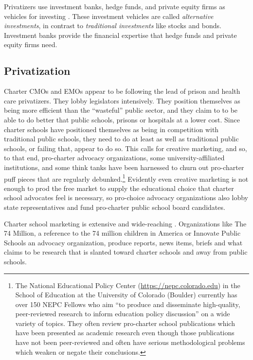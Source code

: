 Privatizers use investment banks, hedge funds, and private equity firms as vehicles for investing \parencite{Stowell2018}. These investment vehicles are called \textit{alternative investments}, in contrast to \textit{traditional investments} like stocks and bonds. Investment banks provide the financial expertise that hedge funds and private equity firms need. 

\subsection{Privatization}\label{sec:privatization}\indent

Charter CMOs and EMOs appear to be following the lead of prison and health care privatizers. They lobby legislators intensively. They position themselves as being more efficient than the ``wasteful'' public sector, and they claim to to be able to do better that public schools, prisons or hospitals at a lower cost. Since charter schools have positioned themselves as being in competition with traditional public schools, they need to do at least as well as traditional public schools, or failing that, appear to do so. This calls for creative marketing, and so, to that end, pro-charter advocacy organizations, some university-affiliated institutions, and some think tanks have been harnessed to churn out pro-charter puff pieces that are regularly debunked.\footnote{The National Educational Policy Center (\url{https://nepc.colorado.edu}) in the School of Education at the University of Colorado (Boulder) currently has over 150 NEPC Fellows who aim ``to produce and disseminate high-quality, peer-reviewed research to inform education policy discussion'' on a wide variety of topics. They often review pro-charter school publications which have been presented as academic research even though those publications have not been peer-reviewed and often have serious methodological problems which weaken or negate their conclusions.} Evidently even creative marketing is not enough to prod the free market to supply the educational choice that charter school advocates feel is necessary, so pro-choice advocacy organizations also lobby state representatives and fund pro-charter public school board candidates.

Charter school marketing is extensive and wide-reaching \parencite{Finalsite2024, CSC2019, Cohen.Lizotte2015}. Organizations like The 74 Million, a reference to the 74 million children in America \parencite{The74Million2024} or Innovate Public Schools \parencite{InnovatePublicSchools2014} an advocacy organization, produce reports, news items, briefs and what claims to be research that is slanted toward charter schools and away from public schools.

